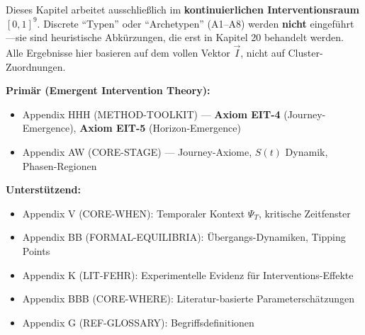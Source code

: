 \begin{tcolorbox}[colback=red!5!white, colframe=red!75!black,
    title=\textbf{Wichtig: Keine diskreten Typen in diesem Kapitel}]
Dieses Kapitel arbeitet ausschließlich im \textbf{kontinuierlichen Interventionsraum} $[0,1]^9$.
Discrete ``Typen'' oder ``Archetypen'' (A1--A8) werden \textbf{nicht} eingeführt---sie sind
heuristische Abkürzungen, die erst in Kapitel 20 behandelt werden. Alle Ergebnisse hier
basieren auf dem vollen Vektor $\vec{I}$, nicht auf Cluster-Zuordnungen.
\end{tcolorbox}

\begin{tcolorbox}[colback=yellow!10!white, colframe=orange!75!black,
    title=Appendix References for This Chapter]

\textbf{Primär (Emergent Intervention Theory):}
\begin{itemize}[nosep]
\item Appendix HHH (METHOD-TOOLKIT) --- \textbf{Axiom EIT-4} (Journey-Emergence), \textbf{Axiom EIT-5} (Horizon-Emergence)
\item Appendix AW (CORE-STAGE) --- Journey-Axiome, $S(t)$ Dynamik, Phasen-Regionen
\end{itemize}

\textbf{Unterstützend:}
\begin{itemize}[nosep]
\item Appendix V (CORE-WHEN): Temporaler Kontext $\Psi_T$, kritische Zeitfenster
\item Appendix BB (FORMAL-EQUILIBRIA): Übergangs-Dynamiken, Tipping Points
\item Appendix K (LIT-FEHR): Experimentelle Evidenz für Interventions-Effekte
\item Appendix BBB (CORE-WHERE): Literatur-basierte Parameterschätzungen
\item Appendix G (REF-GLOSSARY): Begriffsdefinitionen
\end{itemize}
\end{tcolorbox}

